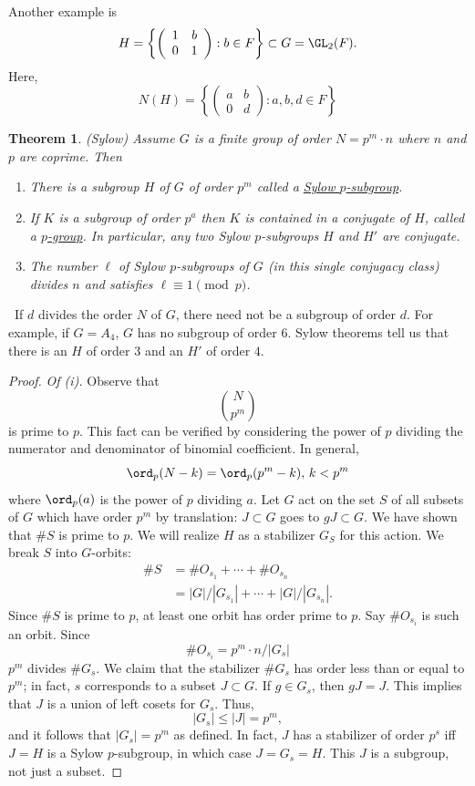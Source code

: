 \documentclass[11pt, oneside]{amsart}
\numberwithin{equation}{section}
\newtheorem{theorem}{Theorem}
\numberwithin{theorem}{section}
\theoremstyle{definition}
\begin{document}
{Another example is 
$$
H = \left\{ \left( \begin{array}{cc} 1 & b \\ 0 & 1\end{array} \right) : b\in F \right\} \subset G = \GL_2(F).
$$
Here, 
$$
N(H) = \left\{\left( \begin{array}{cc} a & b \\ 0 & d\end{array} \right) : a,b,d\in F\right\}
$$
\begin{theorem}
(Sylow) Assume $G$ is a finite group of order $N=p^m\cdot n$ where $n$ and $p$ are coprime.  Then 
\begin{enumerate}[label=(\roman*)]
\item There is a subgroup $H$ of $G$ of order $p^m$ called a \underline{Sylow $p$-subgroup}.
\item If $K$ is a subgroup of order $p^a$ then $K$ is contained in a conjugate of $H$, called a \underline{$p$-group}. In particular, any two Sylow $p$-subgroups $H$ and $H'$ are conjugate. %
\item The number $\ell$ of Sylow $p$-subgroups of $G$ (in this single conjugacy class) divides $n$ and satisfies $\ell \equiv 1\pmod p$.
\end{enumerate}
\end{theorem}
\noindent\hspace*{-23pt} \dbend\ If $d$ divides the order $N$ of $G$, there need not be a subgroup of order $d$. For example, if $G = A_4$, $G$ has no subgroup of order $6$. Sylow theorems tell us that there is an $H$ of order $3$ and an $H'$ of order $4$.

\begin{proof}
\textit{Of (i).} Observe that 
$$
\binom{N}{p^m}
$$
is prime to $p$. This fact can be verified by considering the power of $p$ dividing the numerator and denominator of binomial coefficient. In general, 
$$
\ord_p (N-k) = \ord_p (p^m-k),\, k < p^m
$$
where $\ord_p(a)$ is the power of $p$ dividing $a$. Let $G$ act on the set $S$ of all subsets of $G$ which have order $p^m$ by translation: $J\subset G$ goes to $gJ\subset G$. We have shown that $\# S$ is prime to $p$. We will realize $H$ as a stabilizer $G_S$ for this action. We break $S$ into $G$-orbits:
\begin{align*}
\# S 	&= \# O_{s_1} +\cdots + \# O_{s_n} \\
	&= |G|/|G_{s_1}| + \cdots + |G|/|G_{s_n}|.
\end{align*}
Since $\# S$ is prime to $p$, at least one orbit has order prime to $p$. Say $\#O_{s_i}$ is such an orbit. Since
$$
\#O_{s_i} = p^m \cdot n / |G_s|
$$
$p^m$ divides $\# G_s$. We claim that the stabilizer $\# G_s$ has order less than or equal to $p^m$; in fact, $s$ corresponds to a subset $J\subset G$. If $g\in G_s$, then $gJ=J$. This implies that $J$ is a union of left cosets for $G_s$. Thus, 
$$
|G_s| \leqslant |J| = p^m,
$$
and it follows that $|G_s| = p^m$ as defined. In fact, $J$ has a stabilizer of order $p^s$ iff $J=H$ is a Sylow $p$-subgroup, in which case $J=G_s=H$. This $J$ is a subgroup, not just a subset.
\end{proof}

}
\end{document}
